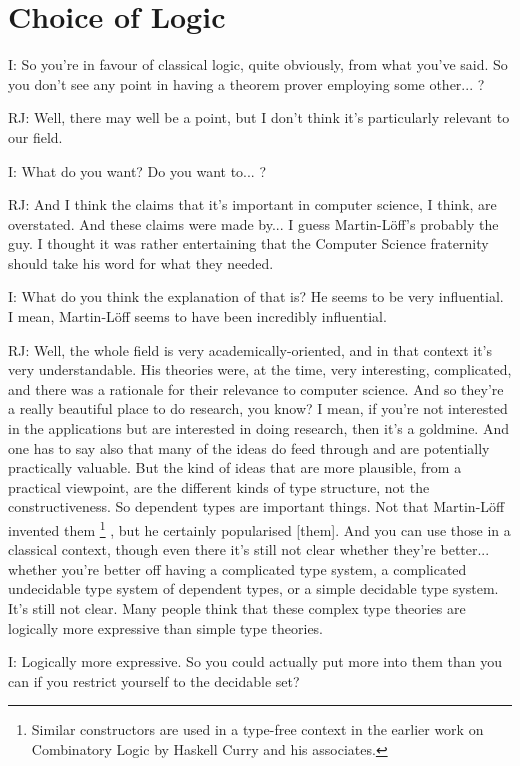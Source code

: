 \documentclass[10pt,titlepage]{book}
\def\ouml{\"o}
\begin{document}
\section{Choice of Logic}

I: So you're in favour of classical logic, quite obviously, from what you've said.
So you don't see any point in having a theorem prover employing some other... ?

RJ: Well, there may well be a point, but I don't think it's particularly relevant to our field.

I: What do you want?
Do you want to... ?

RJ: And I think the claims that it's important in computer science, I think, are overstated.
And these claims were made by... I guess Martin-L\"off's\index{Martin-L{\ouml}ff} probably the guy.
I thought it was rather entertaining that the Computer Science fraternity should take his word for what they needed.

I: What do you think the explanation of that is?
He seems to be very influential.
I mean, Martin-L\"off seems to have been incredibly influential.

RJ: Well, the whole field is very academically-oriented, and in that context it's very understandable.
His theories were, at the time, very interesting, complicated, and there was a rationale for their relevance to computer science.
And so they're a really beautiful place to do research, you know?
I mean, if you're not interested in the applications but are interested in doing research, then it's a goldmine.
And one has to say also that many of the ideas do feed through and are potentially practically valuable.
But the kind of ideas that are more plausible, from a practical viewpoint, are the different kinds of type structure, not the constructiveness.
So dependent types are important things.
Not that Martin-L\"off invented them%
\footnote{
Similar constructors are used in a type-free context in the earlier work on Combinatory Logic by Haskell Curry and his associates.
}%
, but he certainly popularised [them].
And you can use those in a classical context, though even there it's still not clear whether they're better... whether you're better off having a complicated type system, a complicated undecidable type system of dependent types, or a simple decidable type system.
It's still not clear.
Many people think that these complex type theories are logically more expressive than simple type theories.

I: Logically more expressive.
So you could actually put more into them than you can if you restrict yourself to the decidable set?
\end{document}
